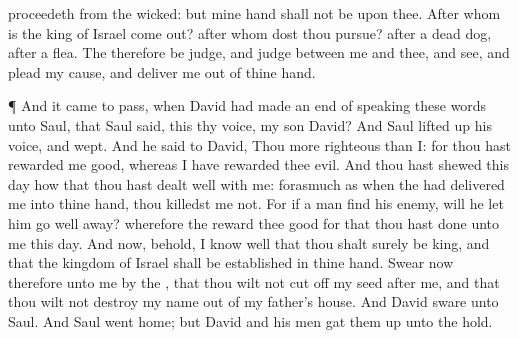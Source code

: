 {proceedeth from the
wicked: but mine
hand shall not be upon thee.
After whom is the
king of
Israel come
out?
after whom dost thou
pursue?
after a
dead
dog,
after
a
flea.
The
{} therefore be
judge, and
judge between me and thee, and
see, and
plead my
cause, and
deliver me out of thine
hand.
\par }{\PP {}¶ And it came to pass, when
David had made an
end of
speaking these
words unto
Saul, that
Saul
said,
{} this thy
voice, my
son
David? And
Saul lifted
up his
voice, and
wept.
And he
said to
David, Thou
{} more
righteous than I: for thou hast
rewarded me
good, whereas I have
rewarded thee
evil.
And thou hast
shewed this
day how that thou hast
dealt
well with me: forasmuch as when the
{} had
delivered me into thine
hand, thou
killedst me not.
For if a
man
find his
enemy, will he let him
go
well
away? wherefore the
{}
reward thee
good for that thou hast
done unto me this
day.
And now, behold, I know
well that thou shalt
surely be
king, and that the
kingdom of
Israel shall be
established in thine
hand.
Swear now therefore unto me by the
{}, that thou wilt
not cut
off my
seed
after me, and that thou wilt not
destroy my
name out of my
father’s
house.
And
David
sware unto
Saul. And
Saul
went
home; but
David and his
men gat them
up unto the
hold.

}
